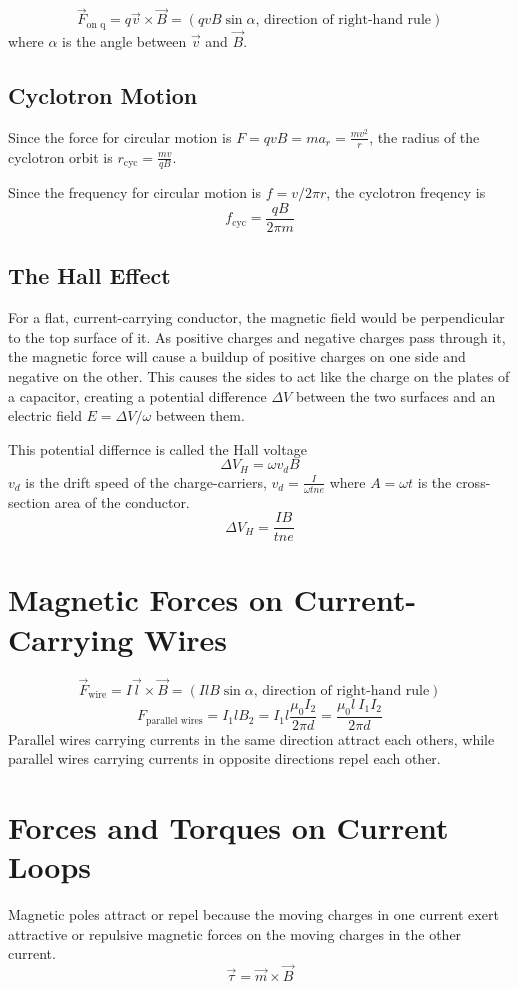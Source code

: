 \documentclass{article}
\begin{document}
\[\vec{F}_\text{on q}=q\vec{v}\times \vec{B}=(qvB\sin\alpha\text{, direction of right-hand rule})\]
where $\alpha$ is the angle between $\vec{v}$ and $\vec{B}$.

\subsection*{Cyclotron Motion}
Since the force for circular motion is $F=qvB=ma_r=\frac{mv^2}{r}$, the radius of the cyclotron
orbit is $r_\text{cyc}=\frac{mv}{qB}$.
\vspace{1em}

Since the frequency for circular motion is $f=v/2\pi r$, the cyclotron freqency is
\[f_\text{cyc}=\frac{qB}{2\pi m}\]

\subsection*{The Hall Effect}
For a flat, current-carrying conductor, the magnetic field would be perpendicular to the top
surface of it. As positive charges and negative charges pass through it, the magnetic force will
cause a buildup of positive charges on one side and negative on the other. This causes the sides to
act like the charge on the plates of a capacitor, creating a potential difference $\Delta V$
between the two surfaces and an electric field $E=\Delta V/\omega$ between them.
\vspace{1em}

This potential differnce is called the Hall voltage
\[\Delta V_H=\omega v_d B\]
$v_d$ is the drift speed of the charge-carriers, $v_d=\frac{I}{\omega t n e}$ where $A=\omega t$ is
the cross-section area of the conductor.
\[\Delta V_H=\frac{IB}{tne}\]

\section*{Magnetic Forces on Current-Carrying Wires}
\[\vec{F}_\text{wire}=I\vec{l}\times \vec{B}=(IlB\sin\alpha\text{, direction of right-hand rule})\]
\[F_\text{parallel wires}=I_1 l B_2 = I_1 l \frac{\mu_0 I_2}{2\pi d}=\frac{\mu_0 l \: I_1 I_2}
{2\pi d}\]
Parallel wires carrying currents in the same direction attract each others, while parallel wires
carrying currents in opposite directions repel each other.

\section*{Forces and Torques on Current Loops}
Magnetic poles attract or repel because the moving charges in one current exert attractive or
repulsive magnetic forces on the moving charges in the other current.
\[\vec{\tau}=\vec{m}\times\vec{B}\]
\end{document}
